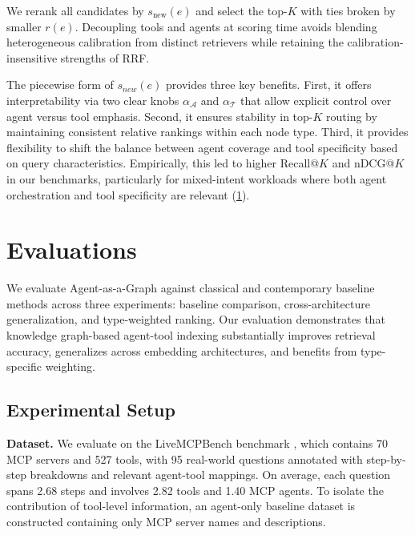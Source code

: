 \documentclass[a4paper,twoside]{article}
\begin{document}
We rerank all candidates by \(s_{\text{new}}(e)\) and select the top-\(K\) with ties broken by smaller \(r(e)\). Decoupling tools and agents at scoring time avoids blending heterogeneous calibration from distinct retrievers while retaining the calibration-insensitive strengths of RRF. 

The piecewise form of \(s_{new}(e)\) provides three key benefits. First, it offers interpretability via two clear knobs \(\alpha_{\mathcal{A}}\) and \(\alpha_{\mathcal{T}}\) that allow explicit control over agent versus tool emphasis. Second, it ensures stability in top-\(K\) routing by maintaining consistent relative rankings within each node type. Third, it provides flexibility to shift the balance between agent coverage and tool specificity based on query characteristics. Empirically, this led to higher Recall@\(K\) and nDCG@\(K\) in our benchmarks, particularly for mixed-intent workloads where both agent orchestration and tool specificity are relevant (\ref{sec:evaluation}).






\section{Evaluations}
\label{sec:evaluation}

We evaluate Agent-as-a-Graph against classical and contemporary baseline methods across three experiments: baseline comparison, cross-architecture generalization, and type-weighted ranking. Our evaluation demonstrates that knowledge graph-based agent-tool indexing substantially improves retrieval accuracy, generalizes across embedding architectures, and benefits from type-specific weighting.

\subsection{Experimental Setup}

\textbf{Dataset.} We evaluate on the LiveMCPBench benchmark \cite{mo2025livemcpbenchagentsnavigateocean,LiveMCPBench_eval_questions_github}, which contains 70 MCP servers and 527 tools, with 95 real-world questions annotated with step-by-step breakdowns and relevant agent-tool mappings. On average, each question spans 2.68 steps and involves 2.82 tools and 1.40 MCP agents. To isolate the contribution of tool-level information, an agent-only baseline dataset is constructed containing only MCP server names and descriptions.
\end{document}
